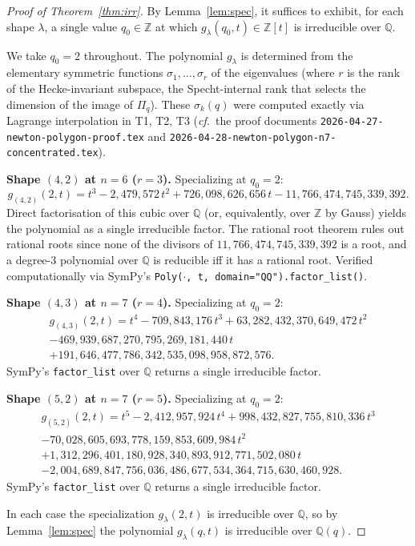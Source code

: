 \documentclass[11pt]{article}
\theoremstyle{remark}
\begin{document}
\begin{proof}[Proof of Theorem~\ref{thm:irr}]
By Lemma~\ref{lem:spec}, it suffices to exhibit, for each shape
$\lambda$, a single value $q_0 \in \mathbb{Z}$ at which
$g_\lambda(q_0, t) \in \mathbb{Z}[t]$ is irreducible over $\mathbb{Q}$.

We take $q_0 = 2$ throughout. The polynomial $g_\lambda$ is determined
from the elementary symmetric functions $\sigma_1, \dots, \sigma_r$ of
the eigenvalues (where $r$ is the rank of the Hecke-invariant subspace,
the Specht-internal rank that selects the dimension of the image of
$\Pi_q$). These $\sigma_k(q)$ were computed exactly via Lagrange
interpolation in T1, T2, T3 (\emph{cf.}~the proof documents
\texttt{2026-04-27-newton-polygon-proof.tex} and
\texttt{2026-04-28-newton-polygon-n7-concentrated.tex}).

\medskip

\noindent\textbf{Shape $(4,2)$ at $n=6$ ($r=3$).} Specializing at $q_0 = 2$:
\[
g_{(4,2)}(2,t) = t^3 - 2{,}479{,}572\,t^2 + 726{,}098{,}626{,}656\,t - 11{,}766{,}474{,}745{,}339{,}392.
\]
Direct factorisation of this cubic over $\mathbb{Q}$ (or, equivalently,
over $\mathbb{Z}$ by Gauss) yields the polynomial as a single
irreducible factor. The rational root theorem rules out rational roots
since none of the divisors of $11{,}766{,}474{,}745{,}339{,}392$ is a
root, and a degree-3 polynomial over $\mathbb{Q}$ is reducible iff it
has a rational root. Verified computationally via SymPy's
\texttt{Poly($\cdot$, t, domain="QQ").factor\_list()}.

\medskip

\noindent\textbf{Shape $(4,3)$ at $n=7$ ($r=4$).} Specializing at $q_0=2$:
\begin{multline*}
g_{(4,3)}(2,t) = t^4 - 709{,}843{,}176\,t^3 + 63{,}282{,}432{,}370{,}649{,}472\,t^2 \\
- 469{,}939{,}687{,}270{,}795{,}269{,}181{,}440\,t \\
+ 191{,}646{,}477{,}786{,}342{,}535{,}098{,}958{,}872{,}576.
\end{multline*}
SymPy's \texttt{factor\_list} over $\mathbb{Q}$ returns a single
irreducible factor.

\medskip

\noindent\textbf{Shape $(5,2)$ at $n=7$ ($r=5$).} Specializing at $q_0=2$:
\begin{multline*}
g_{(5,2)}(2,t) = t^5 - 2{,}412{,}957{,}924\,t^4 + 998{,}432{,}827{,}755{,}810{,}336\,t^3 \\
- 70{,}028{,}605{,}693{,}778{,}159{,}853{,}609{,}984\,t^2 \\
+ 1{,}312{,}296{,}401{,}180{,}928{,}340{,}893{,}912{,}771{,}502{,}080\,t \\
- 2{,}004{,}689{,}847{,}756{,}036{,}486{,}677{,}534{,}364{,}715{,}630{,}460{,}928.
\end{multline*}
SymPy's \texttt{factor\_list} over $\mathbb{Q}$ returns a single
irreducible factor.

\medskip

In each case the specialization $g_\lambda(2, t)$ is irreducible over
$\mathbb{Q}$, so by Lemma~\ref{lem:spec} the polynomial
$g_\lambda(q, t)$ is irreducible over $\mathbb{Q}(q)$.
\end{proof}
\end{document}
